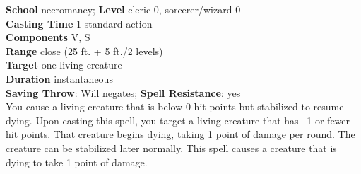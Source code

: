 \textbf{School }necromancy; \textbf{Level }cleric 0, sorcerer/wizard 0\\
\textbf{Casting Time }1 standard action\\
\textbf{Components }V, S\\
\textbf{Range }close (25 ft. + 5 ft./2 levels)\\
\textbf{Target} one living creature\\
\textbf{Duration }instantaneous\\
\textbf{Saving Throw}: Will negates; \textbf{Spell Resistance}: yes\\
You cause a living creature that is below 0 hit points but stabilized to resume dying. Upon casting this spell, you target a living creature that has --1 or fewer hit points. That creature begins dying, taking 1 point of damage per round. The creature can be stabilized later normally. This spell causes a creature that is dying to take 1 point of damage.\\
